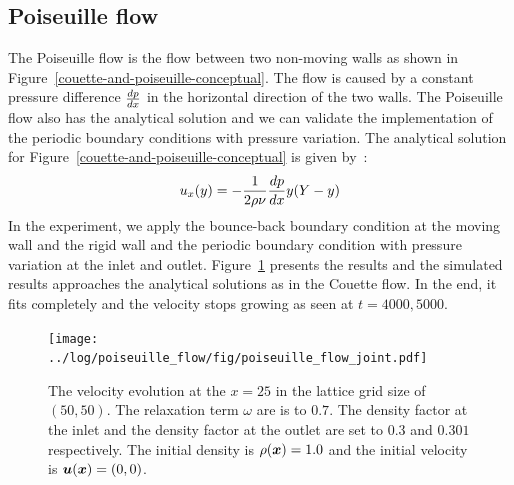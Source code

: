 \subsection{Poiseuille flow}
The Poiseuille flow is the flow between two non-moving walls as shown in Figure~\ref{couette-and-poiseuille-conceptual}.
The flow is caused by a constant pressure difference $\frac{d p}{d x}$
in the horizontal direction of the two walls.
The Poiseuille flow also has the analytical solution
and we can validate the implementation of the periodic boundary conditions
with pressure variation.
The analytical solution for Figure~\ref{couette-and-poiseuille-conceptual} is given by~\cite{mendiburu2009analytical}:
\begin{equation}
\begin{aligned}
  u_x(y) = - \frac{1}{2\rho \nu} \frac{d p}{d x} y (Y - y)
\end{aligned}
\end{equation}
In the experiment, we apply the bounce-back boundary condition
at the moving wall and the rigid wall
and the periodic boundary condition with pressure variation at the inlet and outlet.
Figure~\ref{fig:poiseuille-velocity-evolution} presents the results
and the simulated results approaches the analytical solutions as in the Couette flow.
In the end, it fits completely
and the velocity stops growing as seen at $t=4000, 5000$.

\begin{figure}[H]
  \centering
  \texttt{[image: ../log/poiseuille\_flow/fig/poiseuille\_flow\_joint.pdf]}
  \caption{The velocity evolution at
  the $x = 25$ in the lattice grid size of $(50, 50)$.
  The relaxation term $\omega$ are is
  to $0.7$.
  The density factor at the inlet and the density factor
  at the outlet are set to $0.3$ and $0.301$ respectively.
  The initial density is $\rho(\boldsymbol{x}) = 1.0$ and the initial velocity is $\boldsymbol{u}(\boldsymbol{x}) = (0, 0)$.
  \label{fig:poiseuille-velocity-evolution}}
\end{figure}


